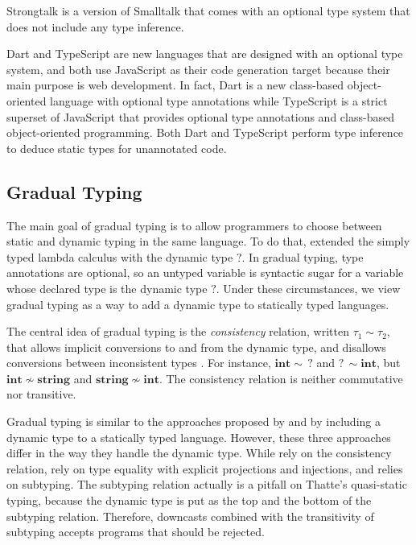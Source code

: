 \documentclass[preprint]{sig-alternate}
\begin{document}
Strongtalk \citep{bracha1993strongtalk,bracha1996strongtalk} is
a version of Smalltalk that comes with an optional type system that
does not include any type inference.

Dart \citep{dart} and TypeScript \citep{typescript} are new
languages that are designed with an optional type system, and both
use JavaScript as their code generation target because their main
purpose is web development.
In fact, Dart is a new class-based object-oriented language with
optional type annotations while TypeScript is a strict superset of
JavaScript that provides optional type annotations and class-based
object-oriented programming.
Both Dart and TypeScript perform type inference to deduce static
types for unannotated code.

\subsection{Gradual Typing}

The main goal of gradual typing \citep{siek2006gradual} is to allow
programmers to choose between static and dynamic typing in the same
language.
To do that, \citet{siek2006gradual} extended the simply typed
lambda calculus with the dynamic type $?$.
In gradual typing, type annotations are optional, so an untyped
variable is syntactic sugar for a variable whose declared type is
the dynamic type $?$.
Under these circumstances, we view gradual typing as a way to add
a dynamic type to statically typed languages.

The central idea of gradual typing is the \textit{consistency}
relation, written $\tau_{1} \sim \tau_{2}$, that allows implicit
conversions to and from the dynamic type, and disallows conversions
between inconsistent types \citep{siek2006gradual}.
For instance, $\mathbf{int} \sim \,?$ and $?\, \sim \mathbf{int}$,
but $\mathbf{int} \not\sim \mathbf{string}$ and
$\mathbf{string} \not\sim \mathbf{int}$. 
The consistency relation is neither commutative nor transitive.

Gradual typing is similar to the approaches proposed by
\citet{abadi1989dts} and \citet{thatte1990qst} by including a
dynamic type to a statically typed language.
However, these three approaches differ in the way they handle the
dynamic type.
While \citet{siek2006gradual} rely on the consistency relation,
\citet{abadi1989dts} rely on type equality with explicit projections
and injections, and \citet{thatte1990qst} relies on subtyping.
The subtyping relation actually is a pitfall on Thatte's quasi-static
typing, because the dynamic type is put as the top and the bottom of
the subtyping relation.
Therefore, downcasts combined with the transitivity of subtyping
accepts programs that should be rejected.
\end{document}
